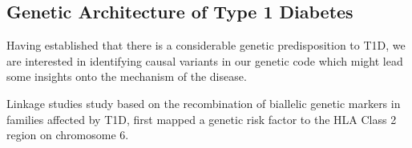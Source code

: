 










\subsection{Genetic Architecture of Type 1 Diabetes}

Having established that there is a considerable genetic predisposition to T1D, we are interested in identifying causal variants in our genetic code which might lead
some insights onto the mechanism of the disease.


Linkage studies study based on the recombination of biallelic genetic markers in families affected by T1D, first mapped a genetic risk factor to the HLA Class 2 region on chromosome 6.


